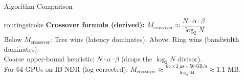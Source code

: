 \documentclass[aspectratio=169, 12pt]{beamer}
\begin{document}
\begin{frame}{Algorithm Comparison}
\vspace{0.15cm}
\begin{mlsyscard}{routingstroke}
\textbf{Crossover formula (derived):} $M_{\text{crossover}} \approx \dfrac{N \cdot \alpha \cdot \beta}{\log_2 N}$\\[0.05cm]
{\footnotesize Below $M_{\text{crossover}}$: Tree wins (latency dominates). Above: Ring wins (bandwidth dominates).\\
Coarse upper-bound heuristic: $N \cdot \alpha \cdot \beta$ (drops the $\log_2 N$ divisor).\\
For 64 GPUs on IB NDR (log-corrected): $M_{\text{crossover}} \approx \frac{64 \times 2\ \mu\text{s} \times 50\ \text{GB/s}}{\log_2 64} \approx 1.1$ MB.}
\end{mlsyscard}

\end{frame}
\end{document}
